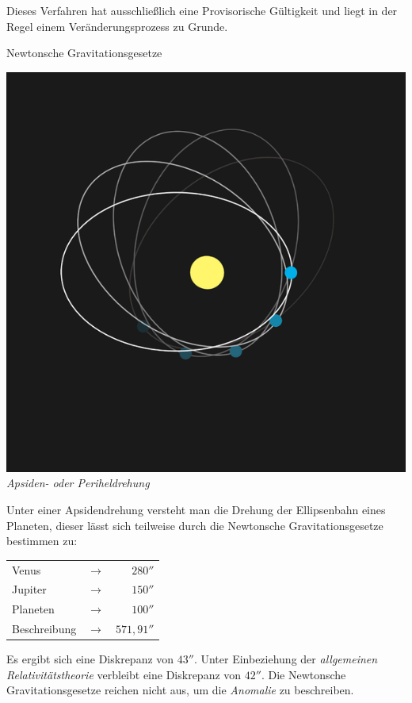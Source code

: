 \documentclass[a4paper,10pt]{scrartcl}
\begin{document}
\begin{merke}
 Dieses Verfahren hat ausschließlich eine Provisorische Gültigkeit und liegt in der Regel einem Veränderungsprozess zu Grunde.
\end{merke}

\begin{ex} Newtonsche Gravitationsgesetze

 \includegraphics[scale=0.1]{apsidendrehung.png}
\emph{Apsiden- oder Periheldrehung}

Unter einer Apsidendrehung versteht man die Drehung der Ellipsenbahn eines Planeten, dieser lässt sich teilweise durch die Newtonsche Gravitationsgesetze bestimmen zu:

\begin{tabular}{l c r}
Venus & $\rightarrow$ & $280''$ \\
Jupiter & $\rightarrow$ & $150''$ \\
Planeten & $ \rightarrow$ & $100''$ \\
Beschreibung & $\rightarrow$ & $571,91''$
\end{tabular}

Es ergibt sich eine Diskrepanz von $43''$.  Unter Einbeziehung der \emph{allgemeinen Relativitätstheorie} verbleibt eine Diskrepanz von $42''$.  Die Newtonsche Gravitationsgesetze reichen nicht aus, um die \emph{Anomalie} zu beschreiben.
\end{ex}
\end{document}
